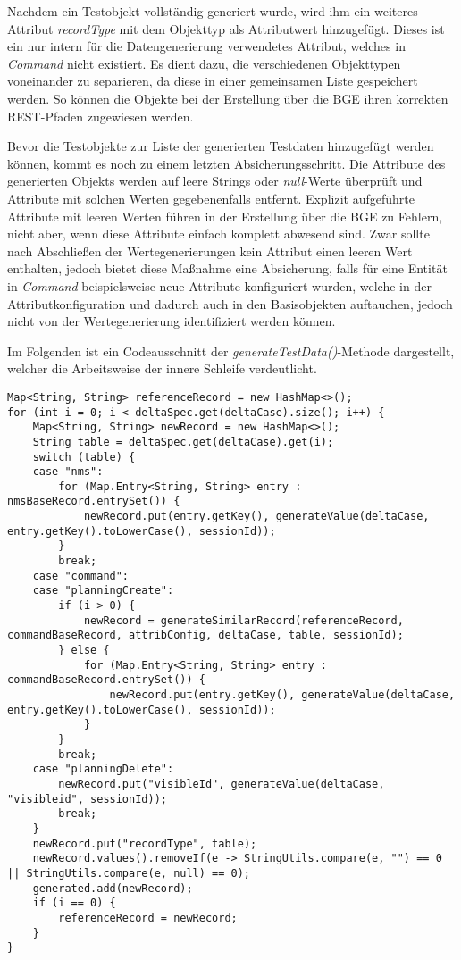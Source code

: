Nachdem ein Testobjekt vollständig generiert wurde, wird ihm ein weiteres Attribut \textit{recordType} mit dem Objekttyp als Attributwert hinzugefügt. Dieses ist ein nur intern für die Datengenerierung verwendetes Attribut, welches in \textit{Command} nicht existiert. Es dient dazu, die verschiedenen Objekttypen voneinander zu separieren, da diese in einer gemeinsamen Liste gespeichert werden. So können die Objekte bei der Erstellung über die \ac{BGE} ihren korrekten \ac{REST}-Pfaden zugewiesen werden. 

Bevor die Testobjekte zur Liste der generierten Testdaten hinzugefügt werden können, kommt es noch zu einem letzten Absicherungsschritt. Die Attribute des generierten Objekts werden auf leere Strings oder \textit{null}-Werte überprüft und Attribute mit solchen Werten gegebenenfalls entfernt. Explizit aufgeführte Attribute mit leeren Werten führen in der Erstellung über die \ac{BGE} zu Fehlern, nicht aber, wenn diese Attribute einfach komplett abwesend sind. Zwar sollte nach Abschließen der Wertegenerierungen kein Attribut einen leeren Wert enthalten, jedoch bietet diese Maßnahme eine Absicherung, falls für eine Entität in \textit{Command} beispielsweise neue Attribute konfiguriert wurden, welche in der Attributkonfiguration und dadurch auch in den Basisobjekten auftauchen, jedoch nicht von der Wertegenerierung identifiziert werden können.

Im Folgenden ist ein Codeausschnitt der \textit{generateTestData()}-Methode dargestellt, welcher die Arbeitsweise der innere Schleife verdeutlicht.

\begin{lstlisting}[caption=Innere Iterationsebene der Datengenerierung, label=innerLoop,style=Javastyle,basicstyle=\fontsize{9.5}{10.5}\ttfamily]
Map<String, String> referenceRecord = new HashMap<>();
for (int i = 0; i < deltaSpec.get(deltaCase).size(); i++) {
    Map<String, String> newRecord = new HashMap<>();
    String table = deltaSpec.get(deltaCase).get(i);
    switch (table) {
    case "nms":
        for (Map.Entry<String, String> entry : nmsBaseRecord.entrySet()) {
            newRecord.put(entry.getKey(), generateValue(deltaCase, entry.getKey().toLowerCase(), sessionId));
        }
        break;
    case "command":
    case "planningCreate":
        if (i > 0) {
            newRecord = generateSimilarRecord(referenceRecord, commandBaseRecord, attribConfig, deltaCase, table, sessionId);
        } else {
            for (Map.Entry<String, String> entry : commandBaseRecord.entrySet()) {
                newRecord.put(entry.getKey(), generateValue(deltaCase, entry.getKey().toLowerCase(), sessionId));
            }
        }
        break;
    case "planningDelete":
        newRecord.put("visibleId", generateValue(deltaCase, "visibleid", sessionId));
        break;
    }
    newRecord.put("recordType", table);
    newRecord.values().removeIf(e -> StringUtils.compare(e, "") == 0 || StringUtils.compare(e, null) == 0);
    generated.add(newRecord);
    if (i == 0) {
        referenceRecord = newRecord;
    }
}
\end{lstlisting}

